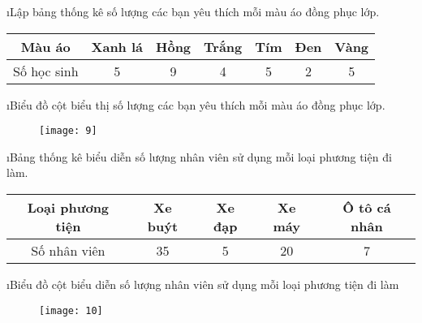 \begin{Answer}{9}
		\begin{enumerate}[a),leftmargin=*]
			\i Lập bảng thống kê số lượng các bạn yêu thích mỗi màu áo đồng phục lớp.
			\begin{center}
				\begin{tabular}{|c|c|c|c|c|c|c|}
					\hline
						Màu áo&	Xanh lá&	Hồng&	Trắng&	Tím&	Đen&	Vàng\\
						\hline
					Số học sinh& 5&9&4&5&2&5\\	
					\hline
				\end{tabular}
			\end{center}
			\i Biểu đồ cột biểu thị số lượng các bạn yêu thích mỗi màu áo đồng phục lớp.
			\begin{figure}[H]
				\centering
				\vspace*{-5pt}
				\captionsetup{labelformat= empty, justification=centering}
				\texttt{[image: 9]}
				\vspace*{-10pt}
			\end{figure}
		\end{enumerate}
	
\end{Answer}
\begin{Answer}{10}
		\begin{enumerate}[a),leftmargin=*]
			\i Bảng thống kê biểu diễn số lượng nhân viên sử dụng mỗi loại phương tiện đi làm.
			\begin{center}
				\begin{tabular}{|c|c|c|c|c|}
					\hline
					Loại phương tiện&	Xe buýt&	Xe đạp&	Xe máy&	Ô tô cá nhân\\
					\hline
					Số nhân viên& 35 &5&20&7\\
					\hline
				\end{tabular}
			\end{center}	
			\i Biểu đồ cột biểu diễn số lượng nhân viên sử dụng mỗi loại phương tiện đi làm
			\begin{figure}[H]
				\centering
				\vspace*{-5pt}
				\captionsetup{labelformat= empty, justification=centering}
				\texttt{[image: 10]}
				\vspace*{-10pt}
			\end{figure}
		\end{enumerate}
	
\end{Answer}
